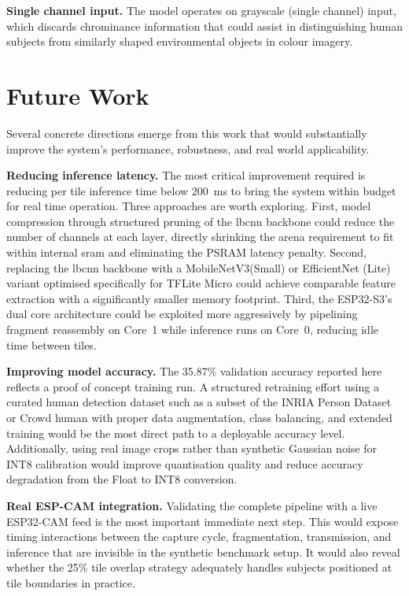 \textbf{Single channel input.} The model operates on grayscale (single channel) input,
which discards chrominance information that could assist in distinguishing human subjects
from similarly shaped environmental objects in colour imagery.
 
\section{Future Work}
 
Several concrete directions emerge from this work that would substantially improve the
system's performance, robustness, and real world applicability.
 
\textbf{Reducing inference latency.} The most critical improvement required is reducing
per tile inference time below 200~ms to bring the system within budget for real time
operation. Three approaches are worth exploring. First, model compression through
structured pruning of the \gls{lbcnn} backbone could reduce the number of channels at
each layer, directly shrinking the arena requirement to fit within internal \gls{sram}
and eliminating the PSRAM latency penalty. Second, replacing the \gls{lbcnn} backbone
with a MobileNetV3(Small) or EfficientNet (Lite) variant optimised specifically for TFLite
Micro could achieve comparable feature extraction with a significantly smaller memory
footprint. Third, the ESP32-S3's dual core architecture could be exploited more
aggressively by pipelining fragment reassembly on Core~1 while inference runs on Core~0,
reducing idle time between tiles.
 
\textbf{Improving model accuracy.} The 35.87\% validation accuracy reported here
reflects a proof of concept training run. A structured retraining effort using a curated
human detection dataset such as a subset of the INRIA Person Dataset or Crowd human
with proper data augmentation, class balancing, and extended training would be the most
direct path to a deployable accuracy level. Additionally, using real image crops rather
than synthetic Gaussian noise for INT8 calibration would improve quantisation quality
and reduce accuracy degradation from the Float to INT8 conversion.
 
\textbf{Real ESP-CAM integration.} Validating the complete pipeline with a live
ESP32-CAM feed is the most important immediate next step. This would expose timing
interactions between the capture cycle, fragmentation, transmission, and inference that
are invisible in the synthetic benchmark setup. It would also reveal whether the 25\%
tile overlap strategy adequately handles subjects positioned at tile boundaries in
practice.
 
